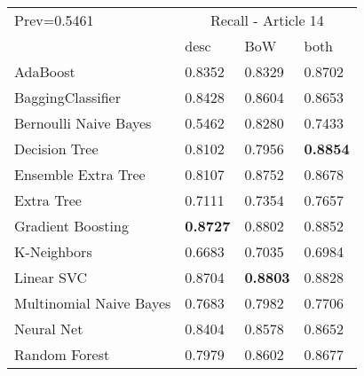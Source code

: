 \begin{tabular}{|l|l|l|l| }
\hline
Prev=0.5461 &  \multicolumn{3}{c|}{Recall - Article 14} \\
\cline{2-4} & desc & BoW & both \\ \hline
AdaBoost                & 0.8352 & 0.8329 & 0.8702\\
BaggingClassifier       & 0.8428 & 0.8604 & 0.8653\\
Bernoulli Naive Bayes   & 0.5462 & 0.8280 & 0.7433\\
Decision Tree           & 0.8102 & 0.7956 & {\bf 0.8854}\\
Ensemble Extra Tree     & 0.8107 & 0.8752 & 0.8678\\
Extra Tree              & 0.7111 & 0.7354 & 0.7657\\
Gradient Boosting       & {\bf 0.8727} & 0.8802 & 0.8852\\
K-Neighbors             & 0.6683 & 0.7035 & 0.6984\\
Linear SVC              & 0.8704 & {\bf 0.8803} & 0.8828\\
Multinomial Naive Bayes & 0.7683 & 0.7982 & 0.7706\\
Neural Net              & 0.8404 & 0.8578 & 0.8652\\
Random Forest           & 0.7979 & 0.8602 & 0.8677\\
\hline
\end{tabular}